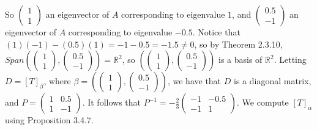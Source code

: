 \documentclass[12pt]{article}
\begin{document}
So $\begin{pmatrix}1\\1\end{pmatrix}$ an eigenvector of $A$ corresponding to eigenvalue $1$, and $\begin{pmatrix}0.5\\-1\end{pmatrix}$ an eigenvector of $A$ corresponding to eigenvalue $-0.5$. Notice that $(1)(-1)-(0.5)(1)=-1-0.5=-1.5\neq0$, so by Theorem 2.3.10, $Span\left(\begin{pmatrix}1\\1\end{pmatrix},\begin{pmatrix}0.5\\-1\end{pmatrix} \right) = \mathbb{R}^2$, so $\left(\begin{pmatrix}1\\1\end{pmatrix},\begin{pmatrix}0.5\\-1\end{pmatrix} \right)$ is a basis of $\mathbb{R}^2$. Letting $D=[T]_{\beta}$, where $\beta=\left(\begin{pmatrix}1\\1\end{pmatrix}, \begin{pmatrix}0.5\\-1\end{pmatrix}\right)$, we have that $D$ is a diagonal matrix, and $P=\begin{pmatrix}1&0.5\\1&-1\end{pmatrix}$. It follows that $P^{-1}=-\frac{2}{3} \begin{pmatrix}-1&-0.5\\-1&1\end{pmatrix}$. We compute $[T]_{\alpha}$ using Proposition 3.4.7.
\end{document}

